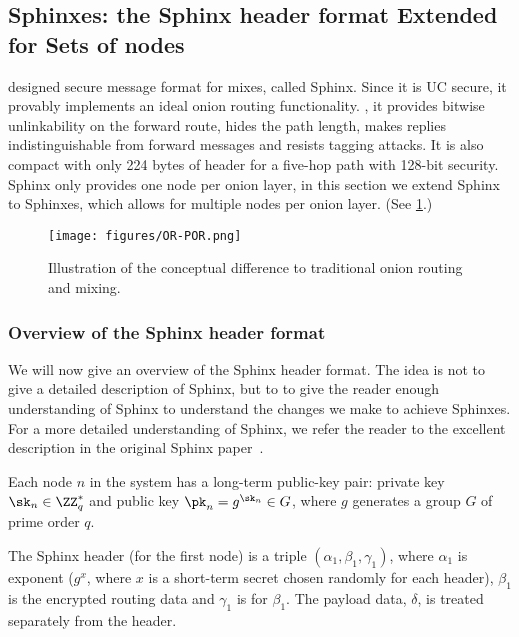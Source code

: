 \subsection{Sphinxes: the Sphinx header format Extended for Sets of nodes}%
\label{Sphinxes}

\Textcite{Sphinx} designed  secure message format for mixes, called 
Sphinx.
Since it is \ac{UC} secure, it provably implements an ideal onion routing 
functionality.
\Ie, it provides bitwise unlinkability on the forward route, hides the path 
length, makes replies indistinguishable from forward messages and resists 
tagging attacks.
It is also compact with only 224 bytes of header for a five-hop path with 
128-bit security.
Sphinx only provides one node per onion layer, in this section we extend Sphinx 
to Sphinxes, which allows for multiple nodes per onion layer.
(See \cref{fig:OR-POR}.)

\begin{figure}
  \texttt{[image: figures/OR-POR.png]}
  \caption{\label{fig:OR-POR}%
    Illustration of the conceptual difference to traditional onion routing and 
    mixing.
  }
\end{figure}

\subsubsection{Overview of the Sphinx header format}

We will now give an overview of the Sphinx header format.
The idea is not to give a detailed description of Sphinx, but to to give the 
reader enough understanding of Sphinx to understand the changes we make to 
achieve Sphinxes.
For a more detailed understanding of Sphinx, we refer the reader to the 
excellent description in the original Sphinx paper~\cite{Sphinx}.


Each node \(n\) in the system has a long-term public-key pair: private key 
\(\sk_n\in \ZZ_q^*\) and public key \(\pk_n = g^{\sk_n}\in G\), where \(g\) 
generates a group \(G\) of prime order \(q\).

The Sphinx header (for the first node) is a triple \((\alpha_1, \beta_1, 
  \gamma_1)\), where \(\alpha_1\) is  exponent (\(g^x\), where \(x\) 
is a short-term secret chosen randomly for each header), \(\beta_1\) is the 
encrypted routing data and \(\gamma_1\) is  for \(\beta_1\).
The payload data, \(\delta\), is treated separately from the header.


